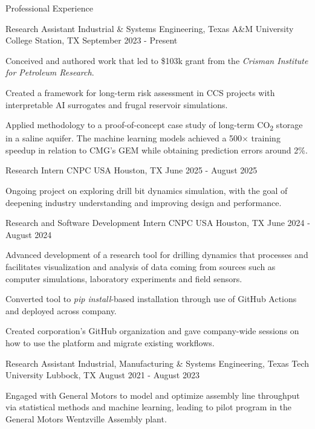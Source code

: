 \begin{cvcontentsection}{Professional Experience}

\begin{cvjob}
    {Research Assistant}
    {Industrial \& Systems Engineering, Texas A\&M University}
    {College Station, TX}
    {September 2023 - Present}
    \item Conceived and authored work that led to \$103k grant from the \textit{Crisman Institute for Petroleum Research}.
    \item Created a framework for long-term risk assessment in CCS projects with interpretable AI surrogates and frugal reservoir simulations.
    \item Applied methodology to a proof-of-concept case study of long-term CO\textsubscript{2} storage in a saline aquifer.
    The machine learning models achieved a 500\( \times \) training speedup in relation to CMG's GEM while obtaining prediction errors around 2\%.
\end{cvjob}

\begin{cvjob}
    {Research Intern}
    {CNPC USA}
    {Houston, TX}
    {June 2025 - August 2025}
    \item Ongoing project on exploring drill bit dynamics simulation, with the goal of deepening industry understanding and improving design and performance.
\end{cvjob}

\begin{cvjob}
    {Research and Software Development Intern}
    {CNPC USA}
    {Houston, TX}
    {June 2024 - August 2024}
    \item Advanced development of a research tool for drilling dynamics that processes and facilitates visualization and analysis of data coming from sources such as computer simulations, laboratory experiments and field sensors.
    \item Converted tool to \textit{pip install}-based installation through use of GitHub Actions and deployed across company.
    \item Created corporation's GitHub organization and gave company-wide sessions on how to use the platform and migrate existing workflows.
\end{cvjob}

\begin{cvjob}
    {Research Assistant}
    {Industrial, Manufacturing \& Systems Engineering, Texas Tech University}
    {Lubbock, TX}
    {August 2021 - August 2023}
    \item Engaged with General Motors to model and optimize assembly line throughput via statistical methods and machine learning, leading to pilot program in the General Motors Wentzville Assembly plant.
\end{cvjob}


\end{cvcontentsection}
